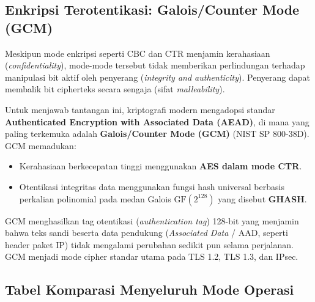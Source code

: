 \subsection{Enkripsi Terotentikasi: Galois/Counter Mode (GCM)}

Meskipun mode enkripsi seperti CBC dan CTR menjamin kerahasiaan (\textit{confidentiality}), mode-mode tersebut tidak memberikan perlindungan terhadap manipulasi bit aktif oleh penyerang (\textit{integrity and authenticity}). Penyerang dapat membalik bit cipherteks secara sengaja (sifat \textit{malleability}).

Untuk menjawab tantangan ini, kriptografi modern mengadopsi standar \textbf{Authenticated Encryption with Associated Data (AEAD)}, di mana yang paling terkemuka adalah \textbf{Galois/Counter Mode (GCM)} (NIST SP 800-38D). GCM memadukan:
\begin{itemize}
  \item Kerahasiaan berkecepatan tinggi menggunakan \textbf{AES dalam mode CTR}.
  \item Otentikasi integritas data menggunakan fungsi hash universal berbasis perkalian polinomial pada medan Galois $\mathrm{GF}(2^{128})$ yang disebut \textbf{GHASH}.
\end{itemize}
GCM menghasilkan tag otentikasi (\textit{authentication tag}) 128-bit yang menjamin bahwa teks sandi beserta data pendukung (\textit{Associated Data} / AAD, seperti header paket IP) tidak mengalami perubahan sedikit pun selama perjalanan. GCM menjadi mode cipher standar utama pada TLS 1.2, TLS 1.3, dan IPsec.

\subsection{Tabel Komparasi Menyeluruh Mode Operasi}

